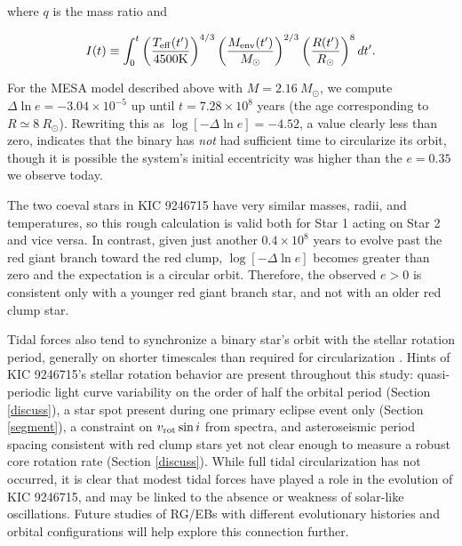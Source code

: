 \noindent where $q$ is the mass ratio and

\begin{equation}
I(t) \equiv \int_0^t \left( \frac{T_{\rm{eff}}(t')}{4500 \rm{K}} \right)^{4/3} \left( \frac{M_{\rm{env}}(t')}{M_{\odot}} \right)^{2/3} \left( \frac{R(t')}{R_{\odot}} \right)^8 dt'. \nonumber
\end{equation}

For the MESA model described above with $M = 2.16 \ M_{\odot}$, we compute $\Delta \ln e = -3.04 \times 10^{-5}$ up until $t = 7.28 \times 10^8$ years (the age corresponding to $R \simeq 8 \ R_{\odot}$). Rewriting this as $\log [-\Delta \ln e] = -4.52$, a value clearly less than zero, indicates that the binary has \emph{not} had sufficient time to circularize its orbit, though it is possible the system's initial eccentricity was higher than the $e = 0.35$ we observe today.

The two coeval stars in KIC 9246715 have very similar masses, radii, and temperatures, so this rough calculation is valid both for Star 1 acting on Star 2 and vice versa. In contrast, given just another $0.4 \times 10^8$ years to evolve past the red giant branch toward the red clump, $\log [-\Delta \ln e]$ becomes greater than zero and the expectation is a circular orbit. Therefore, the observed $e > 0$ is consistent only with a younger red giant branch star, and not with an older red clump star.

Tidal forces also tend to synchronize a binary star's orbit with the stellar rotation period, generally on shorter timescales than required for circularization \citep{ogi14}. Hints of KIC 9246715's stellar rotation behavior are present throughout this study: quasi-periodic light curve variability on the order of half the orbital period (Section \ref{discuss}), a star spot present during one primary eclipse event only (Section \ref{segment}), a constraint on $v_{\rm{rot}} \sin i$ from spectra, and asteroseismic period spacing consistent with red clump stars yet not clear enough to measure a robust core rotation rate (Section \ref{discuss}). While full tidal circularization has not occurred, it is clear that modest tidal forces have played a role in the evolution of KIC 9246715, and may be linked to the absence or weakness of solar-like oscillations. Future studies of RG/EBs with different evolutionary histories and orbital configurations will help explore this connection further.

  
  
  
  
  
  
  
  
  